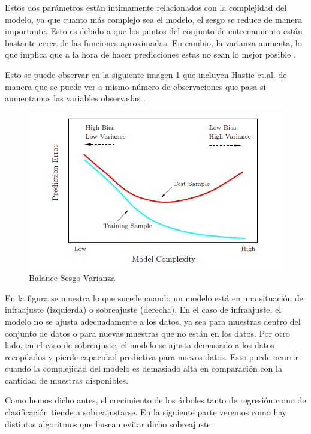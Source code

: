 \noindent Estos dos parámetros están íntimamente relacionados con la complejidad del modelo, ya que cuanto más complejo sea el modelo, el sesgo se reduce de manera importante. Esto es debido a que los puntos del conjunto de entrenamiento están bastante cerca de las funciones aproximadas. En cambio, la varianza aumenta, lo que implica que a la hora de hacer predicciones estas no sean lo mejor posible \cite{Neural Designer}. 

\noindent Esto se puede observar en la siguiente imagen \ref{fig:Balance-sesgo-varianza} que incluyen Hastie et.al. de manera que se puede ver a mismo número de observaciones que pasa si aumentamos las variables observadas \cite{Hastie 2001}. 

\begin{figure}[h]
\centering
\includegraphics[scale=0.3]{Documentos Extra/Imagenes/Bias-Variance-Tradeoff.png}
\caption{Balance Sesgo Varianza}
\label{fig:Balance-sesgo-varianza}
\end{figure}
 
\noindent En la figura se muestra lo que sucede cuando un modelo está en una situación de infraajuste (izquierda) o sobreajuste (derecha). En el caso de infraajuste, el modelo no se ajusta adecuadamente a los datos, ya sea para muestras dentro del conjunto de datos o para nuevas muestras que no están en los datos. Por otro lado, en el caso de sobreajuste, el modelo se ajusta demasiado a los datos recopilados y pierde capacidad predictiva para nuevos datos. Esto puede ocurrir cuando la complejidad del modelo es demasiado alta en comparación con la cantidad de muestras disponibles. 

\noindent Como hemos dicho antes, el crecimiento de los árboles tanto de regresión como de clasificación tiende a  sobreajustarse. En la siguiente parte veremos como hay distintos algoritmos que buscan evitar dicho sobreajuste. 


